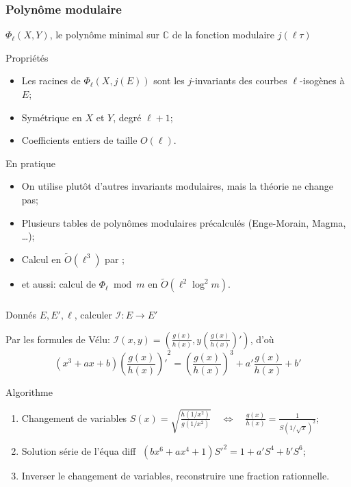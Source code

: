 \documentclass[10pt]{beamer}
\newcommand{\C}{\mathbb{C}}  %
\newcommand{\0}{\mathcal{O}}  %
\newcommand{\isog}[1]{\mathcal{#1}}  %
\newcommand{\I}{\isog{I}}  %
\newcommand{\tildO}{\tilde{O}}  %
\begin{document}

\begin{frame}
  \frametitle{Polynôme modulaire}

  \begin{center}
    $\Phi_\ell(X,Y)$, le polynôme minimal sur $\C$ de la fonction
    modulaire $j(\ell\tau)$
  \end{center}

  \begin{block}{Propriétés}
    \begin{itemize}
    \item Les racines de $\Phi_\ell(X,j(E))$ sont les $j$-invariants
      des courbes $\ell$-isogènes à $E$;
    \item Symétrique en $X$ et $Y$, degré $\ell+1$;
    \item Coefficients entiers de taille $O(\ell)$.
    \end{itemize}
  \end{block}

  \begin{block}{En pratique}
    \begin{itemize}
    \item On utilise plutôt d'autres invariants modulaires, mais la théorie ne change pas;
    \item Plusieurs tables de polynômes modulaires précalculés (Enge-Morain, Magma, \dots);
    \item Calcul en \alert{$\tildO(\ell^3)$} par \cite{sutherland10:modpol};
    \item et aussi: calcul de $\Phi_\ell \bmod m$ en \alert{$\tildO(\ell^2\log^2m)$}.
    \end{itemize}
  \end{block}
\end{frame}


\begin{frame}
  \frametitle{\cite{bostan+morain+salvy+schost08}}

  \begin{center}
    \Large
    Donnés $E, E', \ell$, calculer $\I:E\to E'$
  \end{center}

  Par les formules de Vélu:
  $\I(x,y) = \left(\frac{g(x)}{h(x)}, y\left(\frac{g(x)}{h(x)}\right)'\right)$,
  d'où
  \[(x^3 + ax + b){\left(\frac{g(x)}{h(x)}\right)'}^2 =
  \left(\frac{g(x)}{h(x)}\right)^3 + a'\frac{g(x)}{h(x)} + b'\]
  
  \begin{block}{Algorithme}
    \begin{enumerate}
    \item Changement de variables $ S(x) =
      \sqrt{\frac{h(1/x^2)}{g(1/x^2)}} \quad\Leftrightarrow\quad
      \frac{g(x)}{h(x)} = \frac{1}{S(1/\sqrt{x})^2}$;
    \item Solution série de l'équa diff $\;(bx^6 + ax^4 +
      1){S'}^2 = 1 + a'S^4 + b'S^6$;
    \item Inverser le changement de variables, reconstruire une
      fraction rationnelle.
    \end{enumerate}
  \end{block}
\end{frame}
\end{document}
